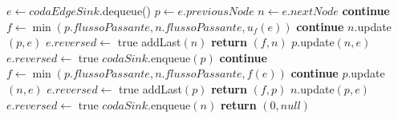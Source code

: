 \documentclass{article}
\begin{document}
\begin{algorithm}
    \begin{algorithmic}
        \STATE $e \leftarrow codaEdgeSink.$dequeue()
        \STATE $p \leftarrow e.previousNode$
        \STATE $n \leftarrow e.nextNode$
        \textbf{continue}
        \ELSE
        \STATE $f \leftarrow \min(p.flussoPassante,n.flussoPassante,u_f(e))$
        \STATE \textbf{continue}
        \ENDIF
        \STATE $n.$update$(p,e)$
        \STATE $e.reversed \leftarrow$ true
        \STATE addLast$(n)$
        \STATE \textbf{return} $(f,n)$
        \ENDIF
        \ENDIF
        \STATE $p.$update$(n,e)$
        \STATE $e.reversed \leftarrow$ true
        \STATE $codaSink.$enqueue$(p)$
        \textbf{continue}
        \ELSE
        \STATE $f \leftarrow \min(p.flussoPassante,n.flussoPassante,f(e))$
        \STATE \textbf{continue}
        \ENDIF
        \STATE $p.$update$(n,e)$
        \STATE $e.reversed \leftarrow$ true
        \STATE addLast$(p)$
        \STATE \textbf{return} $(f,p)$
        \ENDIF
        \ENDIF
        \STATE $n.$update$(p,e)$
        \STATE $e.reversed \leftarrow$ true
        \STATE $codaSink.$enqueue$(n)$
        \ENDIF
        \ENDIF
        \ENDWHILE
        \ENDWHILE
        \STATE \textbf{return} $(0,null)$
    \end{algorithmic}
\end{algorithm}
\end{document}
